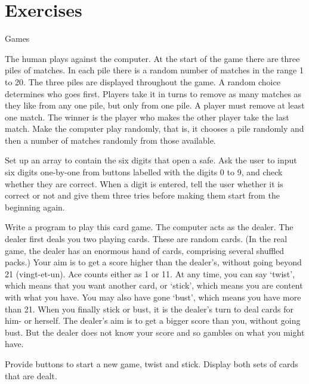 		\section{Exercises}
			Games
			\begin{EXE}
				\item {} The human plays against the computer. At the start of the game there are three piles of matches. In each pile there is a random number of matches in the range 1 to 20. The three piles are displayed throughout the game. A random choice determines who goes first. Players take it in turns to remove as many matches as they like from any one pile, but only from one pile. A player must remove at least one match. The winner is the player who makes the other player take the last match. Make the computer play randomly, that is, it chooses a pile randomly and then a number of matches randomly from those available.
				\item	{} Set up an array to contain the six digits that open a safe. Ask the user to input six digits one-by-one from buttons labelled with the digits 0 to 9, and check whether they are correct. When a digit is entered, tell the user whether it is correct or not and give them three tries before making them start from the beginning again.
				\item {} Write a program to play this card game. The computer acts as the dealer. The dealer first deals you two playing cards. These are random cards. (In the real game, the dealer has an enormous hand of cards, comprising several shuffled packs.) Your aim is to get a score higher than the dealer's, without going beyond 21 (vingt-et-un). Ace counts either as 1 or 11. At any time, you can say ‘twist', which means that you want another card, or ‘stick', which means you are content with what you have. You may also have gone ‘bust', which means you have more than 21. When you finally stick or bust, it is the dealer's turn to deal cards for him- or herself. The dealer's aim is to get a bigger score than you, without going bust. But the dealer does not know your score and so gambles on what you might have.
				
					Provide buttons to start a new game, twist and stick. Display both sets of cards that are dealt.
			\end{EXE}


